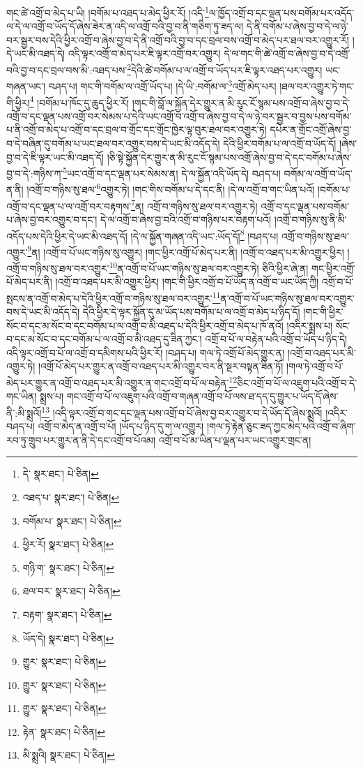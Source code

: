 གང་ཚེ་འགྲོ་བ་མེད་པ་ཡི། །བགོམ་པ་འཐད་པ་མེད་ཕྱིར་རོ། །འདི་\footnote{དེ་  སྣར་ཐང་།  པེ་ཅིན། }ལ་ཁྱོད་འགྲོ་བ་དང་ལྡན་པས་བགོམ་པར་འདོད་ལ་དེ་ལ་འགྲོ་བ་ཡོད་དོ་ཞེས་ཟེར་ན་འདི་ལ་འགྲོ་བའི་བྱ་བ་ནི་གཅིག་ཏུ་ཟད་ལ། དེ་ནི་བགོམ་པ་ཞེས་བྱ་བ་དེ་ལ་ཉེ་བར་སྦྱར་བས་དེའི་ཕྱིར་འགྲོ་བ་ཞེས་བྱ་བ་དེ་ནི་འགྲོ་བའི་བྱ་བ་དང་བྲལ་བས་འགྲོ་བ་མེད་པར་ཐལ་བར་འགྱུར་རོ། །དེ་ཡང་མི་འཐད་དེ། འདི་ལྟར་འགྲོ་བ་མེད་པར་ཇི་ལྟར་འགྲོ་བར་འགྱུར། དེ་ལ་གང་གི་ཚེ་འགྲོ་བ་ཞེས་བྱ་བ་དེ་འགྲོ་བའི་བྱ་བ་དང་བྲལ་བས་མི་:འཐད་པས་\footnote{འཐད་པ་  སྣར་ཐང་།  པེ་ཅིན། }དེའི་ཚེ་བགོམ་པ་ལ་འགྲོ་བ་ཡོད་པར་ཇི་ལྟར་འཐད་པར་འགྱུར། ཡང་གཞན་ཡང་། བཤད་པ། གང་གི་བགོམ་ལ་འགྲོ་ཡོད་པ། །དེ་ཡི་:བགོམ་ལ་\footnote{བགོམ་པ་  སྣར་ཐང་།  པེ་ཅིན། }འགྲོ་མེད་པར། །ཐལ་བར་འགྱུར་ཏེ་གང་གི་ཕྱིར།\footnote{ཕྱིར་རོ།  སྣར་ཐང་།  པེ་ཅིན། } །བགོམ་པ་ཁོང་དུ་ཆུད་ཕྱིར་རོ། །གང་གི་བློ་ལ་སྐྱོན་དེར་གྱུར་ན་མི་རུང་ངོ་སྙམ་པས་འགྲོ་བ་ཞེས་བྱ་བ་དེ་འགྲོ་བ་དང་ལྡན་པས་འགྲོ་བར་སེམས་པ་དེའི་ཡང་འགྲོ་བ་འགྲོ་བ་ཞེས་བྱ་བ་དེ་ལ་ཉེ་བར་སྦྱར་བ་བྱས་པས་བགོམ་པ་ནི་འགྲོ་བ་མེད་པ་འགྲོ་བ་དང་བྲལ་བ་གྲོང་དང་གྲོང་ཁྱེར་ལྟ་བུར་ཐལ་བར་འགྱུར་ཏེ། དཔེར་ན་གྲོང་འགྲོ་ཞེས་བྱ་བ་དེ་བཞིན་དུ་བགོམ་པ་ཡང་ཐལ་བར་འགྱུར་བས་དེ་ཡང་མི་འདོད་དེ། དེའི་ཕྱིར་བགོམ་པ་ལ་འགྲོ་བ་ཡོད་དོ། །ཞེས་བྱ་བ་དེ་ཇི་ལྟར་ཡང་མི་འཐད་དོ། །ཅི་སྟེ་སྐྱོན་དེར་གྱུར་ན་མི་རུང་ངོ་སྙམ་པས་འགྲོ་ཞེས་བྱ་བ་དེ་དང་བགོམ་པ་ཞེས་བྱ་བ་དེ་:གཉིས་ཀ་\footnote{གཉི་ག་  སྣར་ཐང་།  པེ་ཅིན། }ཡང་འགྲོ་བ་དང་ལྡན་པར་སེམས་ན། དེ་ལ་སྐྱོན་འདི་ཡོད་དེ། བཤད་པ། བགོམ་ལ་འགྲོ་བ་ཡོད་ན་ནི། །འགྲོ་བ་གཉིས་སུ་ཐལ་\footnote{ཐལ་བར་  སྣར་ཐང་།  པེ་ཅིན། }འགྱུར་ཏེ། །གང་གིས་བགོམ་པ་དེ་དང་ནི། །དེ་ལ་འགྲོ་བ་གང་ཡིན་པའོ། །བགོམ་པ་འགྲོ་བ་དང་ལྡན་པ་ལ་འགྲོ་བར་བརྟགས་\footnote{བརྟག་  སྣར་ཐང་།  པེ་ཅིན། }ན། འགྲོ་བ་གཉིས་སུ་ཐལ་བར་འགྱུར་ཏེ། འགྲོ་བ་དང་ལྡན་པས་བགོམ་པ་ཞེས་བྱ་བར་འགྱུར་བ་དང་། དེ་ལ་འགྲོ་བ་ཞེས་བྱ་བའི་འགྲོ་བ་གཉིས་པར་བརྟག་པའོ། །འགྲོ་བ་གཉིས་སུ་ནི་མི་འདོད་པས་དེའི་ཕྱིར་དེ་ཡང་མི་འཐད་དོ། །དེ་ལ་སྐྱོན་གཞན་འདི་ཡང་:ཡོད་དོ།\footnote{ཡོད་དེ།  སྣར་ཐང་།  པེ་ཅིན། } །བཤད་པ། འགྲོ་བ་གཉིས་སུ་ཐལ་འགྱུར་\footnote{གྱུར་  སྣར་ཐང་།  པེ་ཅིན། }ན། །འགྲོ་བ་པོ་ཡང་གཉིས་སུ་འགྱུར། །གང་ཕྱིར་འགྲོ་པོ་མེད་པར་ནི། །འགྲོ་བ་འཐད་པར་མི་འགྱུར་ཕྱིར། །འགྲོ་བ་གཉིས་སུ་ཐལ་བར་འགྱུར་\footnote{གྱུར་  སྣར་ཐང་།  པེ་ཅིན། }ན་འགྲོ་བ་པོ་ཡང་གཉིས་སུ་ཐལ་བར་འགྱུར་ཏེ། ཅིའི་ཕྱིར་ཞེ་ན། གང་ཕྱིར་འགྲོ་པོ་མེད་པར་ནི། །འགྲོ་བ་འཐད་པར་མི་འགྱུར་ཕྱིར། །གང་གི་ཕྱིར་འགྲོ་བ་པོ་ཡོད་ན་འགྲོ་བ་ཡང་ཡོད་ཀྱི། འགྲོ་བ་པོ་སྤངས་ན་འགྲོ་བ་མེད་པ་དེའི་ཕྱིར་འགྲོ་བ་གཉིས་སུ་ཐལ་བར་འགྱུར་\footnote{གྱུར་  སྣར་ཐང་།  པེ་ཅིན། }ན་འགྲོ་བ་པོ་ཡང་གཉིས་སུ་ཐལ་བར་འགྱུར་བས་དེ་ཡང་མི་འདོད་དེ། དེའི་ཕྱིར་དེ་ལྟར་སྐྱོན་དུ་མ་ཡོད་པས་བགོམ་པ་ལ་འགྲོ་བ་མེད་པ་ཉིད་དོ། །གང་གི་ཕྱིར་སོང་བ་དང་མ་སོང་བ་དང་བགོམ་པ་ལ་འགྲོ་བ་མི་འཐད་པ་དེའི་ཕྱིར་འགྲོ་བ་མེད་པ་ཁོ་ནའོ། །འདིར་སྨྲས་པ། སོང་བ་དང་མ་སོང་བ་དང་བགོམ་པ་ལ་འགྲོ་བ་མི་འཐད་དུ་ཟིན་ཀྱང་། འགྲོ་བ་པོ་ལ་བརྟེན་པའི་འགྲོ་བ་ཡོད་པ་ཉིད་དེ། འདི་ལྟར་འགྲོ་བ་པོ་ལ་འགྲོ་བ་དམིགས་པའི་ཕྱིར་རོ། །བཤད་པ། གལ་ཏེ་འགྲོ་པོ་མེད་གྱུར་ན། །འགྲོ་བ་འཐད་པར་མི་འགྱུར་ཏེ། །འགྲོ་པོ་མེད་པར་གྱུར་ན་འགྲོ་བ་འཐད་པར་མི་འགྱུར་བར་ནི་སྔར་བསྟན་ཟིན་ཏོ། །གལ་ཏེ་འགྲོ་བ་པོ་མེད་པར་གྱུར་ན་འགྲོ་བ་འཐད་པར་མི་འགྱུར་ན་གང་འགྲོ་བ་པོ་ལ་བརྟེན་\footnote{རྟེན་  སྣར་ཐང་།  པེ་ཅིན། }ཅིང་འགྲོ་བ་པོ་ལ་འཇུག་པའི་འགྲོ་བ་དེ་གང་ཡིན། སྨྲས་པ། གང་འགྲོ་བ་པོ་ལ་འཇུག་པའི་འགྲོ་བ་གཞན་འགྲོ་བ་པོ་ལས་ཐ་དད་དུ་གྱུར་པ་ཡོད་དོ་ཞེས་ནི་:མི་སྨྲའོ།\footnote{མི་སྨྲའི།  སྣར་ཐང་།  པེ་ཅིན། } །འདི་ལྟར་འགྲོ་བ་གང་དང་ལྡན་པས་འགྲོ་བ་པོ་ཞེས་བྱ་བར་འགྱུར་བ་དེ་ཡོད་དོ་ཞེས་སྨྲའོ། །འདིར་བཤད་པ། འགྲོ་བ་མེད་ན་འགྲོ་བ་པོ། །ཡོད་པ་ཉིད་དུ་ག་ལ་འགྱུར། །གལ་ཏེ་རྟེན་ཅུང་ཟད་ཀྱང་མེད་པའི་འགྲོ་བ་ཞིག་རབ་ཏུ་གྲུབ་པར་གྱུར་ན་ནི་དེ་དང་འགྲོ་བ་པོའམ། འགྲོ་བ་པོ་མ་ཡིན་པ་ལྡན་པར་ཡང་འགྱུར་གྲང་ན། 